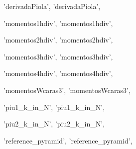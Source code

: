  'derivadaPiola',
 'derivadaPiola',

 'momentos1hdiv',
 'momentos1hdiv',

 'momentos2hdiv',
 'momentos2hdiv',

 'momentos3hdiv',
 'momentos3hdiv',

 'momentos4hdiv',
 'momentos4hdiv',

 'momentosWcaras3',
 'momentosWcaras3',

 'piu1_k_in_N',
 'piu1_k_in_N',

 'piu2_k_in_N',
 'piu2_k_in_N',

 'reference_pyramid',
 'reference_pyramid',
